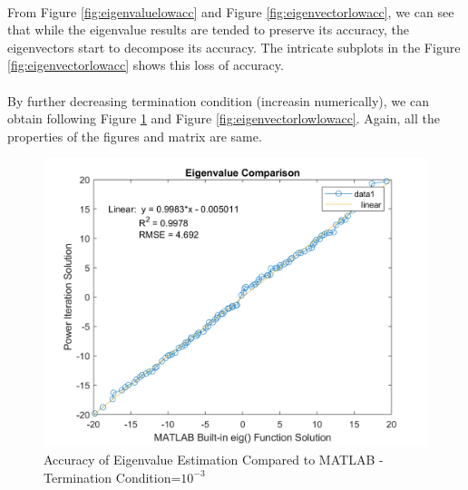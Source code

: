\documentclass[letterpaper,12pt]{article}
\begin{document}
      \paragraph{}From Figure \ref{fig:eigenvaluelowacc} and Figure \ref{fig:eigenvectorlowacc}, we can see that while the eigenvalue results are tended to preserve its accuracy, the eigenvectors start to decompose its accuracy. The intricate subplots in the Figure \ref{fig:eigenvectorlowacc} shows this loss of accuracy.
      \paragraph{} By further decreasing termination condition (increasin numerically), we can obtain following Figure \ref{fig:eigenvaluelowlowacc} and Figure \ref{fig:eigenvectorlowlowacc}. Again, all the properties of the figures and matrix are same.
      \begin{figure}[H] 
         \centering \includegraphics[width=0.7\columnwidth]{figures/eigenvaluelowlowacc.png}           
                        \caption{Accuracy of Eigenvalue Estimation Compared to MATLAB - Termination Condition=$10^{-3}$}                
                           \label{fig:eigenvaluelowlowacc}
         \end{figure}  
   
\end{document}
